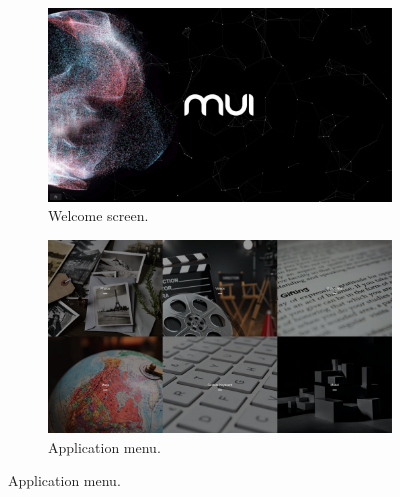 
\begin{figure}[p]
    \centering
    \begin{subfigure}{.47\textwidth}
        \centering
        \includegraphics[width=.96\linewidth]{Figures/LUI/UI/welcome_screen_lui.pdf}  
        \vspace{-5pt}
        \captionsetup{width=.9\linewidth}
        \caption{Welcome screen.}
        \label{fig:lui:screenshots:welcome-screen}
    \end{subfigure}
    \begin{subfigure}{.47\textwidth}
        \centering
        \includegraphics[width=.96\linewidth]{Figures/LUI/UI/app_menu.pdf}  
        \vspace{-5pt}
        \captionsetup{width=.9\linewidth}
        \caption{Application menu.}
        \label{fig:lui:screenshots:app-menu}
    \end{subfigure}


\end{figure}
